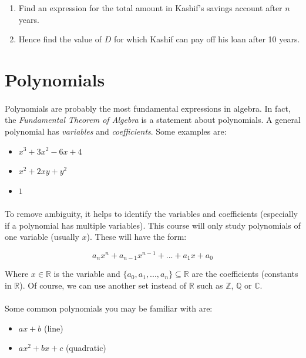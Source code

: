 \documentclass[12pt, a4paper, titlepage, twoside]{article}
\newcommand*{\Z}{\mathbb{Z}}
\newcommand*{\Q}{\mathbb{Q}}
\newcommand*{\R}{\mathbb{R}}
\newcommand*{\C}{\mathbb{C}}
\begin{document}
	\begin{enumerate}[label=\textbf{(\alph*)}]
		\item Find an expression for the total amount in Kashif's savings account after $n$ years.
		\item Hence find the value of $D$ for which Kashif can pay off his loan after 10 years.
	\end{enumerate}
	
	\newpage
	
\section{Polynomials}

	\paragraph{}
	Polynomials are probably the most fundamental expressions in algebra. In fact, the \textit{Fundamental Theorem of Algebra} is 
	a statement about polynomials. A general polynomial has \textit{variables} and \textit{coefficients}. Some examples are:
	
	\begin{itemize}
		\item $x^3 + 3x^2 - 6x + 4$
		\item $x^2 + 2xy + y^2$
		\item $1$
	\end{itemize}
	
	\paragraph{}
	To remove ambiguity, it helps to identify the variables and coefficients (especially if a polynomial has multiple variables). This
	course will only study polynomials of one variable (usually $x$). These will have the form:
	
	$$a_n x^n + a_{n-1} x^{n-1} + ... + a_1 x + a_0$$

	Where $x \in \R$ is the variable and $\{a_0, a_1, ..., a_n\} \subseteq \R$ are the coefficients (constants in $\R$).
	Of course, we can use another set instead of $\R$ such as $\Z$, $\Q$ or $\C$.
	
	\paragraph{}
	Some common polynomials you may be familiar with are:
	
	\begin{itemize}
		\item $ax + b$ (line)
		\item $ax^2 + bx + c$ (quadratic)
	\end{itemize}
\end{document}
